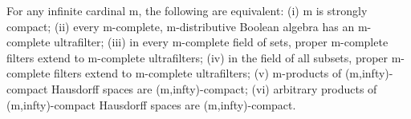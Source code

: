 For any infinite cardinal m, the following are equivalent: (i) m is strongly compact; (ii) every m-complete, m-distributive Boolean algebra has an m-complete ultrafilter; (iii) in every m-complete field of sets, proper m-complete filters extend to m-complete ultrafilters; (iv) in the field of all subsets, proper m-complete filters extend to m-complete ultrafilters; (v) m-products of (m,infty)-compact Hausdorff spaces are (m,infty)-compact; (vi) arbitrary products of (m,infty)-compact Hausdorff spaces are (m,infty)-compact.

